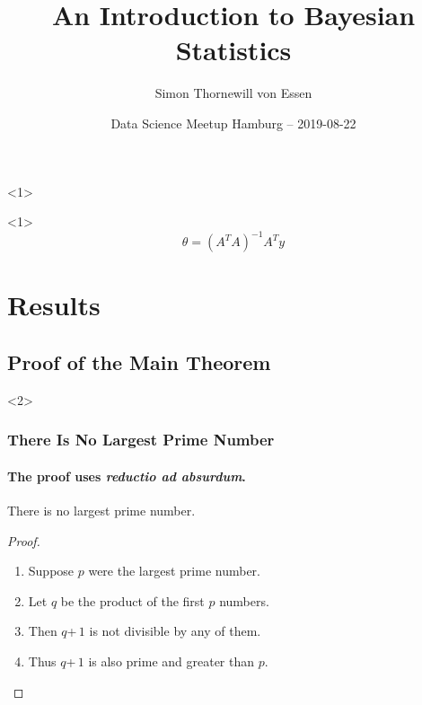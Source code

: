 \documentclass[hyperref={draft}]{beamer}
\title{An Introduction to Bayesian Statistics}
\author{Simon Thornewill von Essen}
\institute{Data Analyst\\ Goodgame Studios}
\date{Data Science Meetup Hamburg -- 2019-08-22}
\begin{document}
\begin{frame}
  \titlepage
\end{frame}

\begin{frame}<1>
  \tableofcontents
\end{frame}

\begin{frame}<1>
  $$\theta = (A^TA)^{-1}A^Ty$$
\end{frame}

\section{Results}
\subsection{Proof of the Main Theorem}

\begin{frame}<2>
  \frametitle{There Is No Largest Prime Number}
  \framesubtitle{The proof uses \textit{reductio ad absurdum}.}

  \begin{theorem}
    There is no largest prime number.
  \end{theorem}
  \begin{proof}
    \begin{enumerate}
    \item<1-| alert@1> Suppose $p$ were the largest prime number.
    \item<2-> Let $q$ be the product of the first $p$ numbers.
    \item<3-> Then $q$\;+\,$1$ is not divisible by any of them.
    \item<1-> Thus $q$\;+\,$1$ is also prime and greater than $p$.\qedhere
    \end{enumerate}
  \end{proof}
\end{frame}
\end{document}
